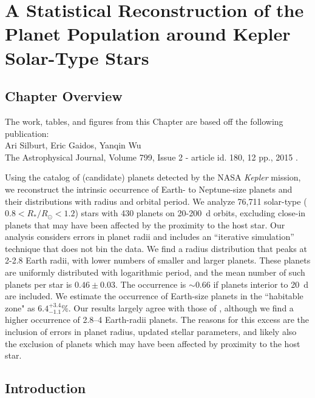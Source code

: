 \chapter[Statistical Reconstruction of Kepler Planets]{A Statistical Reconstruction of the Planet Population around Kepler Solar-Type Stars}
\label{chap:Stats}

\section{Chapter Overview}
	\begin{center}
	\begin{minipage}[c]{4.75in}
	The work, tables, and figures from this Chapter are based off the following publication:\\
	
	Ari Silburt, Eric Gaidos, Yanqin Wu\\
	The Astrophysical Journal, Volume 799, Issue 2 - article id. 180, 12 pp., 2015 \citep{Silburt2015}.
	\vspace{2em}
	\end{minipage}
	\end{center}

Using the \citet{Ramirez2014} catalog of (candidate) planets detected by the
NASA {\it Kepler} mission, we reconstruct the intrinsic occurrence of Earth- to
Neptune-size planets and their distributions with radius and orbital
period.  We analyze 76,711 solar-type ($0.8<R_*/R_{\odot}<1.2 $) stars with 430 planets 
on 20-200~d orbits, excluding close-in planets that may have been affected by
the proximity to the host star.  Our analysis considers errors in
planet radii and includes an ``iterative simulation'' technique that
does not bin the data.  We find a radius distribution that peaks at
2-2.8 Earth radii, with lower numbers of smaller and larger planets.
These planets are uniformly distributed with logarithmic period, and
the mean number of such planets per star is $0.46 \pm 0.03$.  The
occurrence is $\sim 0.66$ if planets interior to 20~d are included.  We
estimate the occurrence of Earth-size planets in the ``habitable zone"
as $6.4^{+3.4}_{-1.1} \%$.  Our results largely agree with those of \cite{Petigura2013}, 
although we find a higher occurrence of 2.8--4
Earth-radii planets. The reasons for this excess are the inclusion of errors in 
planet radius, updated \cite{Huber2014} stellar parameters, and likely also the 
exclusion of planets which may have been affected by proximity to the host star.

\section{Introduction}
\label{sec:introduction}

